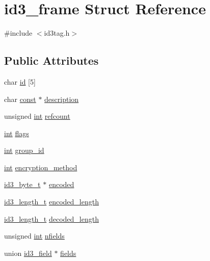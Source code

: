 \hypertarget{structid3__frame}{}\section{id3\+\_\+frame Struct Reference}
\label{structid3__frame}


{\ttfamily \#include $<$id3tag.\+h$>$}

\subsection*{Public Attributes}
\begin{DoxyCompactItemize}
\item 
char \hyperlink{structid3__frame_afba4301780c29934e1d0cf5519bfbfd4}{id} \mbox{[}5\mbox{]}
\item 
char \hyperlink{getopt1_8c_a2c212835823e3c54a8ab6d95c652660e}{const} $\ast$ \hyperlink{structid3__frame_aa0b1abe398eb62b8a0a164937cb09543}{description}
\item 
unsigned \hyperlink{xmltok_8h_a5a0d4a5641ce434f1d23533f2b2e6653}{int} \hyperlink{structid3__frame_aade8349eb17f0380c9ab8fd8bd6fad78}{refcount}
\item 
\hyperlink{xmltok_8h_a5a0d4a5641ce434f1d23533f2b2e6653}{int} \hyperlink{structid3__frame_aa6b4189081db1142834d5074a9a1ca0a}{flags}
\item 
\hyperlink{xmltok_8h_a5a0d4a5641ce434f1d23533f2b2e6653}{int} \hyperlink{structid3__frame_a5f1a46bcf4f0c8011c0cfb7d84b40322}{group\+\_\+id}
\item 
\hyperlink{xmltok_8h_a5a0d4a5641ce434f1d23533f2b2e6653}{int} \hyperlink{structid3__frame_aa77e084d603d355de243111563dcdae3}{encryption\+\_\+method}
\item 
\hyperlink{id3tag_8h_ad73e16dd89b6d075d906ae0649cc7e43}{id3\+\_\+byte\+\_\+t} $\ast$ \hyperlink{structid3__frame_a4109da3f8fb16809bd853d3bacbabe8d}{encoded}
\item 
\hyperlink{id3tag_8h_a26fddaa5bcd55c38142a1fbed8d2835d}{id3\+\_\+length\+\_\+t} \hyperlink{structid3__frame_aeb2c6f15900cad9a304d158030a534b6}{encoded\+\_\+length}
\item 
\hyperlink{id3tag_8h_a26fddaa5bcd55c38142a1fbed8d2835d}{id3\+\_\+length\+\_\+t} \hyperlink{structid3__frame_a44643cee724541f9741ab25df6fab6ad}{decoded\+\_\+length}
\item 
unsigned \hyperlink{xmltok_8h_a5a0d4a5641ce434f1d23533f2b2e6653}{int} \hyperlink{structid3__frame_ae88162f41fc338aba7838d928118d282}{nfields}
\item 
union \hyperlink{unionid3__field}{id3\+\_\+field} $\ast$ \hyperlink{structid3__frame_a118d6c04856e00ce9ae72092118ffacb}{fields}
\end{DoxyCompactItemize}


